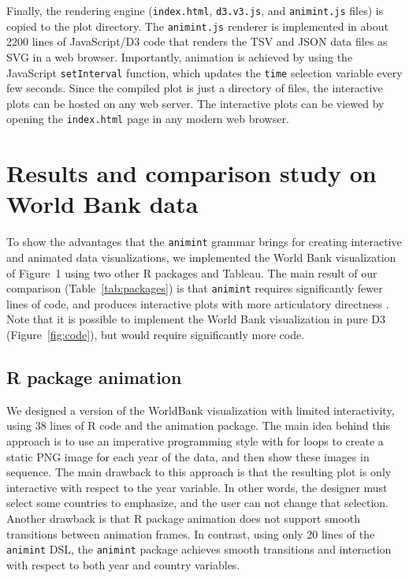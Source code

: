 \documentclass[12pt]{article}\usepackage[]{graphicx}\usepackage[]{color}
\begin{document}
Finally, the rendering engine (\texttt{index.html}, \texttt{d3.v3.js},
and \texttt{animint.js} files) is copied to the plot directory. The
\texttt{animint.js} renderer is implemented in about 2200 lines of
JavaScript/D3 code that renders the TSV and JSON data files as SVG in
a web browser. Importantly, animation is achieved by using the
JavaScript \texttt{setInterval} function, which updates the
\texttt{time} selection variable every few seconds. Since the compiled
plot is just a directory of files, the interactive plots can be hosted
on any web server. The interactive plots can be viewed by opening the
\texttt{index.html} page in any modern web browser.

\section{Results and comparison study on World Bank data}
\label{sec:compare}

To show the advantages that the \texttt{animint} grammar brings for creating
interactive and animated data visualizations, we implemented the World
Bank visualization of Figure~1 using two other R packages and Tableau. The main result of our comparison (Table~\ref{tab:packages}) is that
\texttt{animint} requires significantly fewer lines of code, and produces
interactive plots with more articulatory directness
\citep{Hutchins:1985}. Note that it is possible to implement the World
Bank visualization in pure D3 (Figure~\ref{fig:code}), but would
require significantly more code. %

\subsection{R package animation}
\label{sec:compare-animation}

We designed a version of the WorldBank visualization with limited
interactivity, using 38 lines of R code and the animation
package. The main idea behind this approach is to use an imperative
programming style with for loops to create a static PNG image for each
year of the data, and then show these images in sequence. The main
drawback to this approach is that the resulting plot is only
interactive with respect to the year variable. In other words, the
designer must select some countries to emphasize, and the user can not
change that selection. Another drawback is that R package
animation does not support smooth transitions between
animation frames. In contrast, using only 20 lines of the \texttt{animint} DSL,
the \texttt{animint} package achieves smooth transitions and interaction with
respect to both year and country variables.
\end{document}
